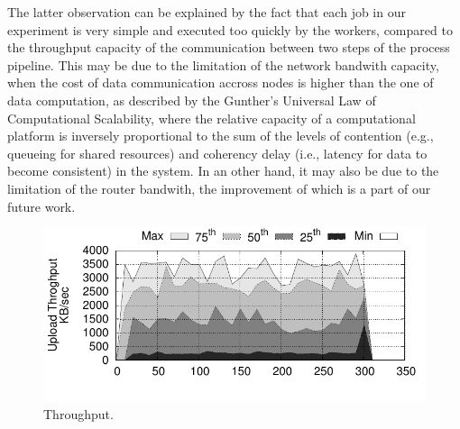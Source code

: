 The latter observation can be explained by the fact that each job in our experiment is very simple and executed too quickly by the workers, compared to the throughput capacity of the communication between two steps of the process pipeline.
This may be due to the limitation of the network bandwith capacity, when the cost of data communication accross nodes is higher than the one of data computation, as described by the Gunther's Universal Law of Computational Scalability\cite{gunther1993simple}, where the relative capacity of a computational platform is inversely proportional to the sum of the levels of contention (e.g., queueing for shared resources) and coherency delay (i.e., latency for data to become consistent) in the system.
In an other hand, it may also be due to the limitation of the router bandwith, the improvement of which is a part of our future work.


\begin{figure}[t!]
  \centering
  \includegraphics[width=.99\linewidth]{images/tput_upload}
  \caption{Throughput.}
  \label{fig:throughput}
\end{figure}
